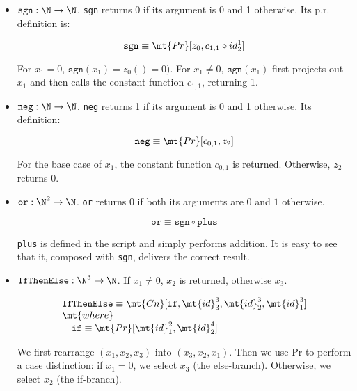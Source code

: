\begin{itemize}
	\item $\texttt{sgn} : \N \rightarrow \N$. \texttt{sgn} returns 0 if its argument is 0 and 1 otherwise. Its p.r. definition is:
	
	$$
		\texttt{sgn} \equiv \mt{Pr}[z_0,c_{1,1} \circ id_2^1]
	$$
	
	For $x_1 = 0$, $\texttt{sgn}(x_1) = z_0() = 0)$. For $x_1 \neq 0$, $\texttt{sgn}(x_1)$ first projects out $x_1$ and then calls the constant function $c_{1,1}$, returning 1.\\
	
	\item $\texttt{neg} : \N \rightarrow \N$. \texttt{neg} returns 1 if its argument is 0 and 1 otherwise. Its definition:
	
	$$
		\texttt{neg} \equiv \mt{Pr}[c_{0,1},z_{2}]
	$$
	
	For the base case of $x_1$, the constant function $c_{0,1}$ is returned. Otherwise, $z_{2}$ returns 0.\\
	
	\item $\texttt{or} : \N^2 \rightarrow \N$. \texttt{or} returns $0$ if both its arguments are $0$ and $1$ otherwise.
	
	$$
		\texttt{or} \equiv \texttt{sgn} \circ \texttt{plus}
	$$
	
	\texttt{plus} is defined in the script and simply performs addition. It is easy to see that it, composed with \texttt{sgn}, delivers the correct result.
	
	\item $\texttt{IfThenElse} : \N^3 \rightarrow \N$. If $x_1 \neq 0$, $x_2$ is returned, otherwise $x_3$.
	
	$$
		\begin{array}{l}
			\texttt{IfThenElse} \equiv \mt{Cn}[\texttt{if}, \mt{id}^3_3, \mt{id}^3_2, \mt{id}^3_1]\\
			\mt{where}\\
			\quad \texttt{if} \equiv \mt{Pr}[\mt{id}^2_1, \mt{id}^4_2]
		\end{array}
	$$
	
	We first rearrange $(x_1,x_2,x_3)$ into $(x_3,x_2,x_1)$. Then we use Pr to perform a case distinction: if $x_1 = 0$, we select $x_3$ (the else-branch). Otherwise, we select $x_2$ (the if-branch).

\end{itemize}

